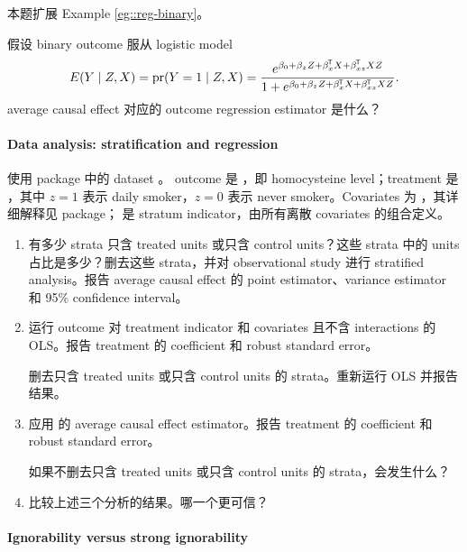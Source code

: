 本题扩展 Example \ref{eg::reg-binary}。 

假设 binary outcome 服从 logistic model
$$
E(Y\mid Z, X) = \textup{pr}(Y =1\mid Z, X) = \frac{   e^{\beta_0 + \beta_z Z + \beta_x ^{\mkern-1.5mu\mathsf{T}} X + \beta_{xz}  ^{\mkern-1.5mu\mathsf{T}} X Z }  }
{ 1+ e^{\beta_0 + \beta_z Z + \beta_x ^{\mkern-1.5mu\mathsf{T}} X + \beta_{xz}  ^{\mkern-1.5mu\mathsf{T}} X Z} } .
$$
average causal effect 对应的 outcome regression estimator 是什么？

\paragraph{Data analysis: stratification and regression}\label{hw::stratification-example-rosenbaum}

使用 package  中的 dataset 。
outcome 是 ，即 homocysteine level；treatment 是 ，其中 $z=1$ 表示 daily smoker，$z=0$ 表示 never smoker。Covariates 为 ，其详细解释见 package； 是 stratum indicator，由所有离散 covariates 的组合定义。


\begin{enumerate}
[(1)]
\item
有多少 strata 只含 treated units 或只含 control units？这些 strata 中的 units 占比是多少？删去这些 strata，并对 observational study 进行 stratified analysis。报告 average causal effect 的 point estimator、variance estimator 和 95\% confidence interval。

\item
运行 outcome 对 treatment indicator 和 covariates 且不含 interactions 的 OLS。报告 treatment 的 coefficient 和 robust standard error。

删去只含 treated units 或只含 control units 的 strata。重新运行 OLS 并报告结果。 


\item
应用 \citet{lin2013} 的 average causal effect estimator。报告 treatment 的 coefficient 和 robust standard error。

如果不删去只含 treated units 或只含 control units 的 strata，会发生什么？


\item
比较上述三个分析的结果。哪一个更可信？

\end{enumerate} 



\paragraph{Ignorability versus strong ignorability}\label{hw::ignorability-difference}


